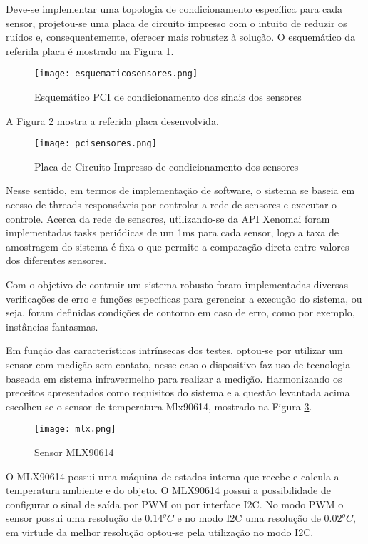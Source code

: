 	Deve-se implementar uma topologia de condicionamento específica para cada sensor, projetou-se uma placa de circuito impresso com o intuito de reduzir os ruídos e, consequentemente, oferecer mais robustez à solução. O esquemático da referida placa é mostrado na Figura \ref{esquemáticosensores}. 

	\begin{figure}[!h]
		\centering
		\texttt{[image: esquematicosensores.png]}
		\caption{Esquemático PCI de condicionamento dos sinais dos sensores}
		\label{esquemáticosensores}
	\end{figure}

	A Figura \ref{pcisensores} mostra a referida placa desenvolvida.

	\newpage
	\begin{figure}[!h]
		\centering
		\texttt{[image: pcisensores.png]}
		\caption{Placa de Circuito Impresso de condicionamento dos sensores}
		\label{pcisensores}
	\end{figure}

	Nesse sentido, em termos de implementação de software, o sistema se baseia em acesso de threads responsáveis por controlar a rede de sensores e executar o controle. Acerca da rede de sensores, utilizando-se da API Xenomai foram implementadas tasks periódicas de um 1ms para cada sensor, logo a taxa de amostragem do sistema é fixa o que permite a comparação direta entre valores dos diferentes sensores. 

	Com o objetivo de contruir um sistema robusto foram implementadas diversas verificações de erro e funções específicas para gerenciar a execução do sistema, ou seja, foram definidas condições de contorno em caso de erro, como por exemplo, instâncias fantasmas.
	 

	Em função das características intrínsecas dos testes, optou-se por utilizar um sensor com medição sem contato, nesse caso o dispositivo faz uso de tecnologia baseada em sistema infravermelho para realizar a medição. Harmonizando os preceitos apresentados como requisitos do sistema e a questão levantada acima escolheu-se o sensor de temperatura Mlx90614, mostrado na Figura \ref{mlx}.

	\begin{figure}[!h]
		\centering
		\texttt{[image: mlx.png]}
		\caption{Sensor MLX90614}
		\label{mlx}
	\end{figure}

	O MLX90614 possui uma máquina de estados interna que recebe e calcula a temperatura ambiente e do objeto. O MLX90614 possui a possibilidade de configurar o sinal de saída por PWM ou por interface I2C. No modo PWM o sensor possui uma resolução de $0.14^oC$ e no modo I2C uma resolução de $0.02^oC$, em virtude da melhor resolução optou-se pela utilização no modo I2C.

